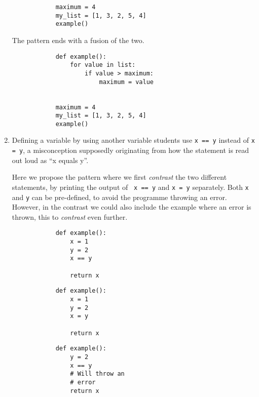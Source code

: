\begin{enumerate}
\begin{verbatim}
            maximum = 4
            my_list = [1, 3, 2, 5, 4]
            example()
        \end{verbatim}
\hfill

The pattern ends with a fusion of the two.
\hfill
        \begin{verbatim}
            def example():
                for value in list:
                    if value > maximum:
                        maximum = value


            maximum = 4
            my_list = [1, 3, 2, 5, 4]
            example()
        \end{verbatim}

\hfill
    
    \item Defining a variable by using another variable students use 
      \texttt{x == y} instead of \texttt{x = y}, a 
      misconception supposedly originating from how the statement is read 
out 
      loud as \enquote{x equals y}.

      Here we propose the pattern where we first \emph{contrast} the two 
different statements, by printing the output of \texttt{
x == y} and \texttt{x = y} separately. Both \texttt{x} and \texttt{y} can be pre-defined, to avoid 
the programme throwing an error. However, in the contrast we could 
also include the example where an error is thrown, this to \emph{
contrast} even further. 

      \hfill
     \begin{minipage}[t]{0.3\columnwidth}
        \begin{verbatim}
            def example():
                x = 1
                y = 2
                x == y
    
                return x
        \end{verbatim}
    \end{minipage}
\hfill
    \begin{minipage}[t]{0.3\columnwidth}
        \begin{verbatim}
            def example():
                x = 1
                y = 2
                x = y
                
                return x
        \end{verbatim}
    \end{minipage}
\hfill
    \begin{minipage}[t]{0.3\columnwidth}
        \begin{verbatim}
            def example():
                y = 2
                x == y 
                # Will throw an 
                # error
                return x
        \end{verbatim}
    \end{minipage}
\hfill
    

\end{enumerate}
